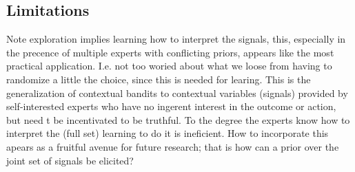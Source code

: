 







\subsection{Limitations}


Note exploration implies learning how to interpret the signals, this, especially in the precence of multiple experts with conflicting priors, appears like the most practical application. I.e. not too woried about what we loose from having to randomize a little the choice, since this is needed for learing. 
This is the generalization of contextual bandits to contextual variables (signals) provided by self-interested experts who have no ingerent interest in the outcome or action, but need t be incentivated to be truthful. 
To the degree the experts know how to interpret the (full set) learning to do it is ineficient. 
How to incorporate this apears as a fruitful avenue for future research; that is how can a prior over the joint set of signals be elicited? 





